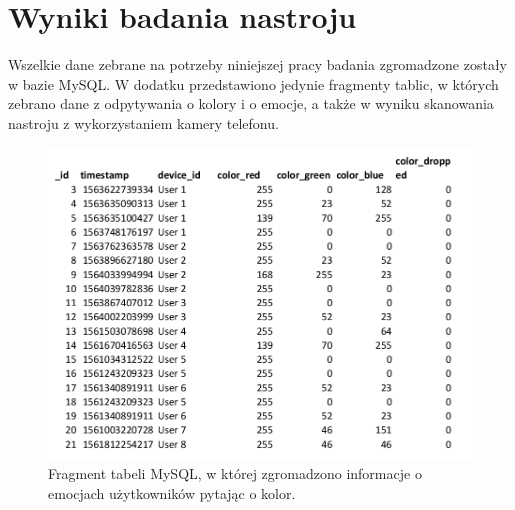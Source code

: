 \chapter{Wyniki badania nastroju}
\label{cha:wyniki badania nastroju}

Wszelkie dane zebrane na potrzeby niniejszej pracy badania zgromadzone zostały w bazie MySQL. W dodatku przedstawiono jedynie fragmenty tablic, w których zebrano dane z odpytywania o kolory i o emocje, a także w wyniku skanowania nastroju z wykorzystaniem kamery telefonu.

\begin{figure}[H]
	\centering
	\includegraphics[scale=0.9]{dodatekB/Color.png}
	\caption{Fragment tabeli MySQL, w której zgromadzono informacje o emocjach użytkowników pytając o kolor.}
\end{figure}
\clearpage

